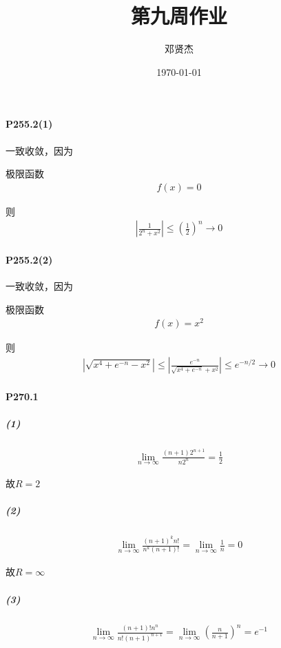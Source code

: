 \documentclass[UTF8]{ctexart}
\title{第九周作业}
\author{邓贤杰}
\date{\today}
\begin{document}
    \maketitle
    \paragraph*{P255.2(1)}
    一致收敛，因为

    极限函数
    \begin{align*}
        f(x) = 0
    \end{align*}

    则
    \begin{align*}
        \left|\frac{1}{2^n+x^2}\right| \le \left(\frac{1}{2} \right)^n \to 0 
    \end{align*}

    \paragraph*{P255.2(2)}
    一致收敛，因为
    
    极限函数
    \begin{align*}
        f(x) = x^2
    \end{align*}

    则
    \begin{align*}
        \left|\sqrt{x^4 + e^{-n} - x^2}\right| 
        \le \left|\frac{e^{-n}}{\sqrt{x^4+e^{-n}} + x^2} \right| 
        \le e^{-n/2} \to 0 
    \end{align*}

    \paragraph*{P270.1}
    \subparagraph*{(1)}
    \begin{align*}
        \lim \limits_{n \to \infty} \frac{(n+1)2^{n+1}}{n 2^n} = \frac{1}{2} 
    \end{align*}

    故$R=2$

    \subparagraph*{(2)}
    \begin{align*}
        \lim \limits_{n \to \infty} \frac{(n+1)^k n!}{n^k (n+1)!} 
        = \lim \limits_{n \to \infty} \frac{1}{n}
        = 0 
    \end{align*}

    故$R=\infty$

    \subparagraph*{(3)}
    \begin{align*}
        \lim \limits_{n \to \infty} \frac{(n+1)!n^n}{n! (n+1)^{n+1}} 
        = \lim \limits_{n \to \infty} \left(\frac{n}{n+1}\right)^n
        = e^{-1}
    \end{align*}
\end{document}
